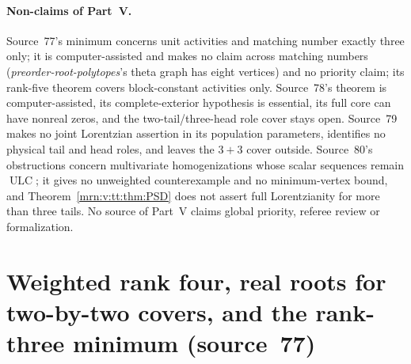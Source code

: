 \documentclass[11pt,a4paper]{article}
\theoremstyle{remark}\newtheorem{remark}[theorem]{Remark}
\newcommand{\ULC}{\operatorname{ULC}}      %
\newcommand{\prp}{\emph{preorder-root-polytopes}}
\begin{document}
\paragraph{Non-claims of Part~V.}
Source~77's minimum concerns unit activities and matching number exactly three
only; it is computer-assisted and makes no claim across matching numbers
(\prp's theta graph has eight vertices) and no priority claim; its rank-five
theorem covers block-constant activities only. Source~78's theorem is
computer-assisted, its complete-exterior hypothesis is essential, its full core
can have nonreal zeros, and the two-tail/three-head role cover stays open.
Source~79 makes no joint Lorentzian assertion in its population parameters,
identifies no physical tail and head roles, and leaves the $3+3$ cover outside.
Source~80's obstructions concern multivariate homogenizations whose scalar
sequences remain $\ULC$; it gives no unweighted counterexample and no
minimum-vertex bound, and Theorem~\ref{mrn:v:tt:thm:PSD} does not assert full
Lorentzianity for more than three tails. No source of Part~V claims global
priority, referee review or formalization.

\section{Weighted rank four, real roots for two-by-two covers, and the rank-three minimum (source~77)}\label{mrn:src:77}
\end{document}
